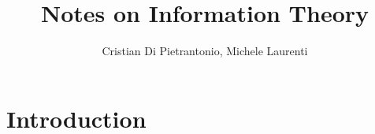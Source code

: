 \documentclass[a4paper, 11pt]{book}
\title{Notes on Information Theory}
\author{Cristian Di Pietrantonio, Michele Laurenti}
\begin{document}
	\maketitle
	
	\chapter{Introduction}
	
	
	
	
	
\end{document}
